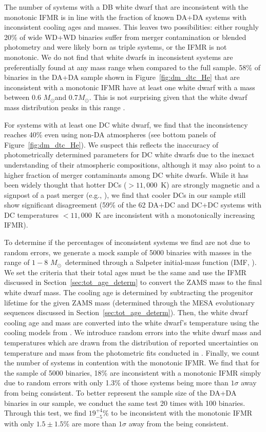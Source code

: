 \documentclass[twocolumn]{aastex631}
\newcommand{\msun}{$M_{\odot}$}
\begin{document}
The number of systems with a DB white dwarf that are inconsistent with the monotonic IFMR is in line with the fraction of known DA+DA systems with inconsistent cooling ages and masses. This leaves two possibilities: either roughly 20\% of wide WD+WD binaries suffer from merger contamination or blended photometry and were likely born as triple systems, or the IFMR is not monotonic. We do not find that white dwarfs in inconsistent systems are preferentially found at any mass range when compared to the full sample. 58\% of binaries in the DA+DA sample shown in Figure~\ref{fig:dm_dtc_He} that are inconsistent with a monotonic IFMR have at least one white dwarf with a mass between 0.6 \msun and 0.7\msun. This is not surprising given that the white dwarf mass distribution peaks in this range \citep{2019MNRAS.482.5222T}.

For systems with at least one DC white dwarf, we find that the inconsistency reaches 40\% even using non-DA atmospheres (see bottom panels of Figure~\ref{fig:dm_dtc_He}). We suspect this reflects the inaccuracy of photometrically determined parameters for DC white dwarfs due to the inexact understanding of their atmospheric compositions, although it may also point to a higher fraction of merger contaminants among DC white dwarfs. While it has been widely thought that hotter DCs ($>11{,}000$~K) are strongly magnetic and a signpost of a past merger (e.g., \citealt{2015MNRAS.447.1713B}), we find that cooler DCs in our sample still show significant disagreement (59\% of the 62 DA+DC and DC+DC systems with DC temperatures $<11{,}000$~K are inconsistent with a monotonically increasing IFMR).

To determine if the percentages of inconsistent systems we find are not due to random errors, we generate a mock sample of 5000 binaries with masses in the range of $1-8$ \msun\ determined through a Salpeter initial-mass function (IMF, \citealt{1955ApJ...121..161S}). We set the criteria that their total ages must be the same and use the IFMR discussed in Section~\ref{sec:tot_age_determ} to convert the ZAMS mass to the final white dwarf mass. The cooling age is determined by subtracting the progenitor lifetime for the given ZAMS mass (determined through the MESA evolutionary sequences discussed in Section~\ref{sec:tot_age_determ}). Then, the white dwarf cooling age and mass are converted into the white dwarf's temperature using the cooling models from \cite{2020ApJ...901...93B}. We introduce random errors into the white dwarf mass and temperatures which are drawn from the distribution of reported uncertainties on temperature and mass from the photometric fits conducted in \cite{2022ApJ...934..148H}. Finally, we count the number of systems in contention with the monotonic IFMR. We find that for the sample of 5000 binaries, 18\% are inconsistent with a monotonic IFMR simply due to random errors with only 1.3\% of those systems being more than $1\sigma$ away from being consistent. To better represent the sample size of the DA+DA binaries in our sample, we conduct the same test 20 times with 100 binaries. Through this test, we find $19^{+4}_{-5}$\% to be inconsistent with the monotonic IFMR with only $1.5\pm1.5$\% are more than $1\sigma$ away from the being consistent. 
\end{document}
